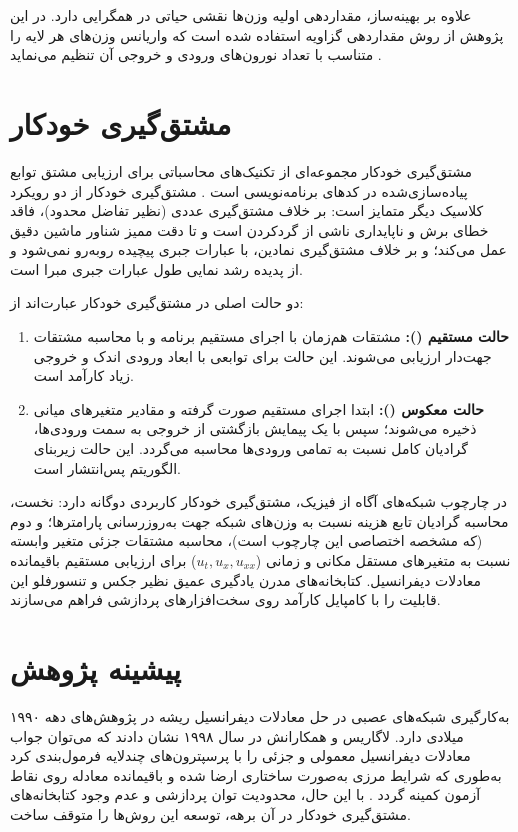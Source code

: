 علاوه بر بهینه‌ساز، مقداردهی اولیه وزن‌ها نقشی حیاتی در همگرایی دارد. در این پژوهش از روش مقداردهی گزاویه استفاده شده است که واریانس وزن‌های هر لایه را متناسب با تعداد نورون‌های ورودی و خروجی آن تنظیم می‌نماید \cite{glorot2010}.

\section{مشتق‌گیری خودکار}
\label{sec:autodiff}

مشتق‌گیری خودکار مجموعه‌ای از تکنیک‌های محاسباتی برای ارزیابی مشتق توابع پیاده‌سازی‌شده در کدهای برنامه‌نویسی است \cite{baydin2018}. مشتق‌گیری خودکار از دو رویکرد کلاسیک دیگر متمایز است: بر خلاف مشتق‌گیری عددی (نظیر تفاضل محدود)، فاقد خطای برش و ناپایداری ناشی از گردکردن است و تا دقت ممیز شناور ماشین دقیق عمل می‌کند؛ و بر خلاف مشتق‌گیری نمادین، با عبارات جبری پیچیده روبه‌رو نمی‌شود و از پدیده رشد نمایی طول عبارات جبری مبرا است.

دو حالت اصلی در مشتق‌گیری خودکار عبارت‌اند از:
\begin{enumerate}
\item \textbf{حالت مستقیم ():} مشتقات هم‌زمان با اجرای مستقیم برنامه و با محاسبه مشتقات جهت‌دار ارزیابی می‌شوند. این حالت برای توابعی با ابعاد ورودی اندک و خروجی زیاد کارآمد است.
\item \textbf{حالت معکوس ():} ابتدا اجرای مستقیم صورت گرفته و مقادیر متغیرهای میانی ذخیره می‌شوند؛ سپس با یک پیمایش بازگشتی از خروجی به سمت ورودی‌ها، گرادیان کامل نسبت به تمامی ورودی‌ها محاسبه می‌گردد. این حالت زیربنای الگوریتم پس‌انتشار است.
\end{enumerate}

در چارچوب شبکه‌های آگاه از فیزیک، مشتق‌گیری خودکار کاربردی دوگانه دارد: نخست، محاسبه گرادیان تابع هزینه نسبت به وزن‌های شبکه جهت به‌روزرسانی پارامترها؛ و دوم (که مشخصه اختصاصی این چارچوب است)، محاسبه مشتقات جزئی متغیر وابسته نسبت به متغیرهای مستقل مکانی و زمانی ($u_t, u_x, u_{xx}$) برای ارزیابی مستقیم باقیمانده معادلات دیفرانسیل. کتابخانه‌های مدرن یادگیری عمیق نظیر جکس \cite{jax2018} و تنسورفلو \cite{abadi2016} این قابلیت را با کامپایل کارآمد روی سخت‌افزارهای پردازشی فراهم می‌سازند.

\section{پیشینه پژوهش}
\label{sec:related}

به‌کارگیری شبکه‌های عصبی در حل معادلات دیفرانسیل ریشه در پژوهش‌های دهه ۱۹۹۰ میلادی دارد. لاگاریس و همکارانش در سال ۱۹۹۸ نشان دادند که می‌توان جواب معادلات دیفرانسیل معمولی و جزئی را با پرسپترون‌های چندلایه فرمول‌بندی کرد به‌طوری که شرایط مرزی به‌صورت ساختاری ارضا شده و باقیمانده معادله روی نقاط آزمون کمینه گردد \cite{lagaris1998}. با این حال، محدودیت توان پردازشی و عدم وجود کتابخانه‌های مشتق‌گیری خودکار در آن برهه، توسعه این روش‌ها را متوقف ساخت.

